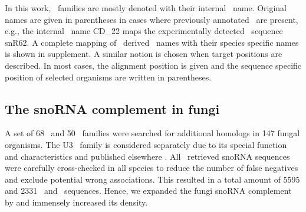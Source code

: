 \newcommand{\TODO}[1] {\begingroup\color{red}#1\endgroup}

In this work, \sno\ families are mostly denoted with their 
internal \snostrip\ name. Original names are given in parentheses in cases where previously annotated \snos\
are present, e.g., the internal \snostrip\ name
CD\_22 maps the experimentally detected \sce\ sequence snR62. A
complete mapping of \snostrip\ derived \sno\ names with their
species specific names is shown in supplement. A
similar notion is chosen when target positions are described. In most
cases, the alignment position is given and the sequence specific
position of selected organisms are written in parentheses. 

\subsection{The snoRNA complement in fungi}

A set of 68 \cd\ and 50 \haca\ families were searched for additional homologs in 
147 fungal organisms. The U3 \sno\ family is considered separately due to its 
special function and characteristics and published elsewhere \cite{Canzler:2017}. All \snostrip\ retrieved snoRNA sequences 
were carefully cross-checked in all species to reduce the number of false 
negatives and exclude potential wrong associations. This resulted in a total 
amount of 5595 and 2331 \cd\ and \haca\ sequences. Hence, we expanded the fungi 
snoRNA complement by \Sebastian{XXX$\%$} and immensely increased its density. 

